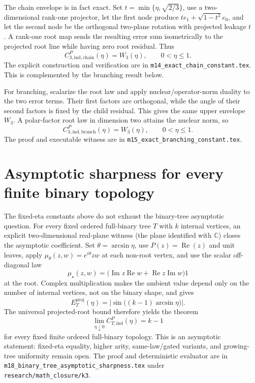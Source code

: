 \documentclass[11pt]{amsart}
\theoremstyle{definition}
\theoremstyle{remark}
\begin{document}
The chain envelope is in fact exact. Set
$t=\min\{\eta,\sqrt{2/3}\}$, use a two-dimensional rank-one projector, let
the first node produce $t e_1+\sqrt{1-t^2}e_0$, and let the second node be
the orthogonal two-plane rotation with projected leakage $t$. A rank-one
root map sends the resulting error sum isometrically to the projected root
line while having zero root residual. Thus
\[
 C_{3,\mathrm{ind},\mathrm{chain}}^P(\eta)=W_3(\eta),
 \qquad 0<\eta\le1.
\]
The explicit construction and verification are in
\texttt{m14\_exact\_chain\_constant.tex}. This
is complemented by the branching result below.

For branching, scalarize the root law and apply nuclear/operator-norm duality
to the two error terms. Their first factors are orthogonal, while the angle
of their second factors is fixed by the child residual. This gives the same
upper envelope $W_3$. A polar-factor root law in dimension two attains the
nuclear norm, so
\[
 C_{3,\mathrm{ind},\mathrm{branch}}^P(\eta)=W_3(\eta),
 \qquad 0<\eta\le1.
\]
The proof and executable witness are in
\texttt{m15\_exact\_branching\_constant.tex}.

\section{Asymptotic sharpness for every finite binary topology}

The fixed-eta constants above do not exhaust the binary-tree asymptotic
question. For every fixed ordered full-binary tree $T$ with $k$ internal
vertices, an explicit two-dimensional real-plane witness (the plane identified
with $\mathbb C$) closes the asymptotic
coefficient. Set $\theta=\arcsin\eta$, use $P(z)=\operatorname{Re}(z)$ and unit
leaves, apply $\mu_\theta(z,w)=e^{i\theta}zw$ at each non-root vertex, and use
the scalar off-diagonal law
\[
 \mu_\star(z,w)=\bigl(\operatorname{Im}z\operatorname{Re}w+
 \operatorname{Re}z\operatorname{Im}w\bigr)1
\]
at the root. Complex multiplication makes the ambient value depend only on
the number of internal vertices, not on the binary shape, and gives
\[
 E_T^{\mathrm{proj}}(\eta)=
 \left|\sin\bigl((k-1)\arcsin\eta\bigr)\right|.
\]
The universal projected-root bound therefore yields the theorem
\[
 \lim_{\eta\downarrow0}C_{T,\mathrm{ind}}^P(\eta)=k-1
\]
for every fixed finite ordered full-binary topology. This is an asymptotic
statement: fixed-eta equality, higher arity, same-law/gated variants, and
growing-tree uniformity remain open. The proof and deterministic evaluator are
in \texttt{m18\_binary\_tree\_asymptotic\_sharpness.tex} under
\texttt{research/math\_closure/k3}.
\end{document}
